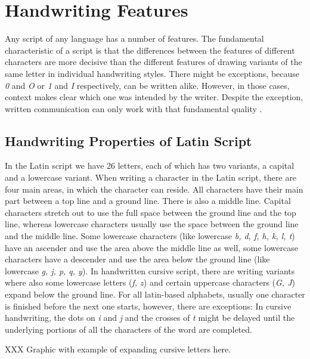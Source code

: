 \section{Handwriting Features}
\label{sec:handwritingfeatures}

Any script of any language has a number of features. The fundamental 
characteristic of a script is that the differences between the features
of different characters are more decisive than the different features of 
drawing variants of the same letter in individual handwriting styles.
There might be exceptions, because \emph{0} and \emph{O} or \emph{1} and 
\emph{I} respectively, can be written alike. However, in those cases, 
context makes clear which one was intended by the writer.
Despite the exception, written communication can only work with that
fundamental quality .

\subsection{Handwriting Properties of Latin Script}
\label{sec:handwritingpropertieslatin}

In the Latin script we have 26 letters, each of which has two variants, 
a capital and a lowercase variant. When writing a character 
in the Latin script, there are four main areas, in which the character 
can reside. All characters have their main part between a top line and a 
ground line. There is also a middle line. Capital characters stretch out to use
the full space between the ground line and the top line, whereas lowercase 
characters usually use the space between the ground line and the middle line. 
Some lowercase characters (like lowercase \emph{b, d, f, h, k, l, t}) have an
ascender and use the area above the middle line as well, 
some lowercase characters have a descender and use the area below the ground 
line (like lowercase \emph{g, j, p, q, y}). In handwritten cursive script, 
there are writing variants where also some lowercase letters (\emph{f, z}) and
certain uppercase characters (\emph{G, J}) expand below the ground line.
For all latin-based alphabets, usually one character is finished before the 
next one starts, however, there are exceptions:
In cursive handwriting, the dots on \emph{i} and \emph{j} and the crosses
of \emph{t} might be delayed until the underlying portions of all 
the characters of the word are completed. 

XXX Graphic with example of expanding cursive letters here.

